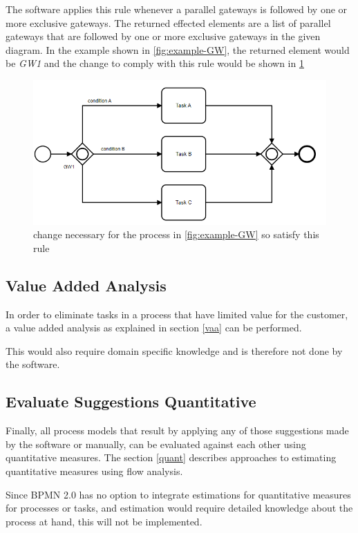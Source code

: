 The software applies this rule whenever a parallel gateways is followed by one or more exclusive gateways. The returned effected elements are a list of parallel gateways that are followed by one or more exclusive gateways in the given diagram. In the example shown in  \ref{fig:example-GW}, the returned element would be \textit{GW1} and the change to comply with this rule would be shown in \ref{fig:example-GW-fix}
\begin{figure}[H]
	\centering
	\includegraphics[width=0.9\columnwidth]{graphics/exclusive-suggestion-2}
	\caption{change necessary for the process in \ref{fig:example-GW} so satisfy this rule} 
	\label{fig:example-GW-fix} 
\end{figure}

\subsection{Value Added Analysis}
In order to eliminate tasks in a process that have limited value for the customer, a value added analysis as explained in section \ref{vaa} can be performed.  

This would also require domain specific knowledge and is therefore not done by the software. 

\subsection{Evaluate Suggestions Quantitative}
Finally, all process models that result by applying any of those suggestions made by the software or manually, can be evaluated against each other using quantitative measures. The section \ref{quant} describes approaches to estimating quantitative measures using flow analysis. 

Since BPMN 2.0 has no option to integrate estimations for quantitative measures for processes or tasks, and estimation would require detailed knowledge about the process at hand, this will not be implemented.

